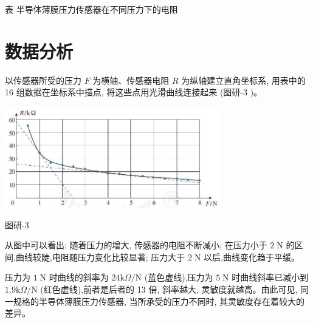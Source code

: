 \documentclass[10pt]{article}
\begin{document}
表 半导体薄膜压力传感器在不同压力下的电阻

\begin{center}
\end{center}

\section*{数据分析}

以传感器所受的压力 \(F\) 为横轴、传感器电阻 \(R\) 为纵轴建立直角坐标系, 用表中的 16 组数据在坐标系中描点, 将这些点用光滑曲线连接起来 (图研-3 )。

\begin{center}
\includegraphics[max width=0.7\textwidth]{images/01910e72-c5b7-7ed5-a6d4-fb3a5faefc32_117_812768.jpg}
\end{center}

图研-3

从图中可以看出: 随着压力的增大, 传感器的电阻不断减小; 在压力小于 \(2\mathrm{\;N}\) 的区间,曲线较陡,电阻随压力变化比较显著; 压力大于 \(2\mathrm{\;N}\) 以后,曲线变化趋于平缓。

压力为 \(1\mathrm{\;N}\) 时曲线的斜率为 \({24}\mathrm{k}\Omega /\mathrm{N}\) (蓝色虚线),压力为 \(5\mathrm{\;N}\) 时曲线斜率已减小到 \({1.9}\mathrm{k}\Omega /\mathrm{N}\) (红色虚线),前者是后者的 13 倍, 斜率越大, 灵敏度就越高。由此可见, 同一规格的半导体薄膜压力传感器, 当所承受的压力不同时, 其灵敏度存在着较大的差异。
\end{document}
